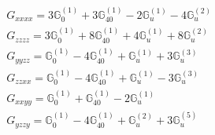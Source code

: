 \documentclass[fleqn,8pt,landscape]{jsarticle}
\begin{document}
\begin{align*}
& G_{xxxx} = 3 \mathbb{G}_{0}^{(1)} + 3 \mathbb{G}_{40}^{(1)} - 2 \mathbb{G}_{u}^{(1)} - 4 \mathbb{G}_{u}^{(2)} \\
& G_{zzzz} = 3 \mathbb{G}_{0}^{(1)} + 8 \mathbb{G}_{40}^{(1)} + 4 \mathbb{G}_{u}^{(1)} + 8 \mathbb{G}_{u}^{(2)} \\
& G_{yyzz} = \mathbb{G}_{0}^{(1)} - 4 \mathbb{G}_{40}^{(1)} + \mathbb{G}_{u}^{(1)} + 3 \mathbb{G}_{u}^{(3)} \\
& G_{zzxx} = \mathbb{G}_{0}^{(1)} - 4 \mathbb{G}_{40}^{(1)} + \mathbb{G}_{u}^{(1)} - 3 \mathbb{G}_{u}^{(3)} \\
& G_{xxyy} = \mathbb{G}_{0}^{(1)} + \mathbb{G}_{40}^{(1)} - 2 \mathbb{G}_{u}^{(1)} \\
& G_{yzzy} = \mathbb{G}_{0}^{(1)} - 4 \mathbb{G}_{40}^{(1)} + \mathbb{G}_{u}^{(2)} + 3 \mathbb{G}_{u}^{(5)}
\end{align*}
\end{document}
